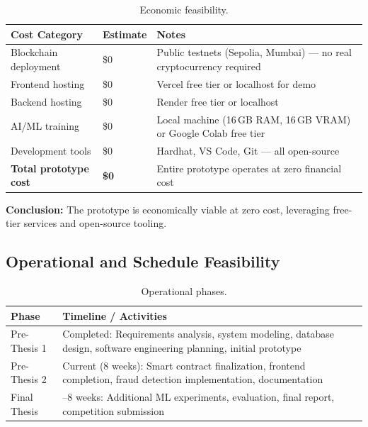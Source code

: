 \documentclass[11pt,a4paper]{article}
\newcommand{\tableheadfont}{\bfseries\small\color{PrimaryBlue}}
\newenvironment{moderntable}[1][H]{%
    \begin{table}[#1]\centering\small%
    \renewcommand{\arraystretch}{1.35}%
}{%
    \end{table}%
}
\begin{document}
\begin{moderntable}
\caption{Economic feasibility.}
\begin{tabular}{@{} >{\raggedright}p{3.5cm} >{\raggedright}p{3cm} >{\raggedright\arraybackslash}p{5.5cm} @{}}
\toprule
\tableheadfont Cost Category & \tableheadfont Estimate & \tableheadfont Notes \\
\midrule
\rowcolor{RowShade}
Blockchain deployment & \$0 & Public testnets (Sepolia, Mumbai) --- no real cryptocurrency required \\
Frontend hosting & \$0 & Vercel free tier or localhost for demo \\
\rowcolor{RowShade}
Backend hosting & \$0 & Render free tier or localhost \\
AI/ML training & \$0 & Local machine (16\,GB RAM, 16\,GB VRAM) or Google Colab free tier \\
\rowcolor{RowShade}
Development tools & \$0 & Hardhat, VS Code, Git --- all open-source \\
\textbf{Total prototype cost} & \textbf{\$0} & Entire prototype operates at zero financial cost \\
\bottomrule
\end{tabular}
\end{moderntable}

\textbf{Conclusion:} The prototype is economically viable at zero cost, leveraging free-tier services and open-source tooling.

\subsection{Operational and Schedule Feasibility}

\begin{moderntable}
\caption{Operational phases.}
\begin{tabular}{@{} >{\raggedright}p{3cm} >{\raggedright\arraybackslash}p{9cm} @{}}
\toprule
\tableheadfont Phase & \tableheadfont Timeline / Activities \\
\midrule
\rowcolor{RowShade}
Pre-Thesis 1 & Completed: Requirements analysis, system modeling, database design, software engineering planning, initial prototype \\
Pre-Thesis 2 & Current (8 weeks): Smart contract finalization, frontend completion, fraud detection implementation, documentation \\
\rowcolor{RowShade}
Final Thesis & 4--8 weeks: Additional ML experiments, evaluation, final report, competition submission \\
\bottomrule
\end{tabular}
\end{moderntable}
\end{document}
